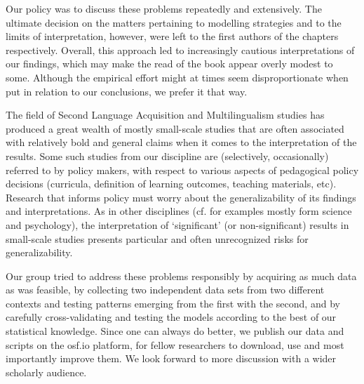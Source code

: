 \documentclass[output=paper]{langsci/langscibook}
\begin{document}
Our policy was to discuss these problems repeatedly and extensively. The ultimate decision on the matters pertaining to modelling strategies and to the limits of interpretation, however, were left to the first authors of the chapters respectively. Overall, this approach led to increasingly cautious interpretations of our findings, which may make the read of the book appear overly modest to some. Although the empirical effort might at times seem disproportionate when put in relation to our conclusions, we prefer it that way.

The field of Second Language Acquisition and Multilingualism studies has produced a great wealth of mostly small-scale studies that are often associated with relatively bold and general claims when it comes to the interpretation of the results. Some such studies from our discipline are (selectively, occasionally) referred to by policy makers, with respect to various aspects of pedagogical policy decisions (curricula, definition of learning outcomes, teaching materials, etc). Research that informs policy must worry about the generalizability of its findings and interpretations. As in other disciplines (cf. \citealt{Ritchie2020} for examples mostly form science and psychology), the interpretation of ‘significant’ (or non-significant) results in small-scale studies presents particular and often unrecognized risks for generalizability.

Our group tried to address these problems responsibly by acquiring as much data as was feasible, by collecting two independent data sets from two different contexts and testing patterns emerging from the first with the second, and by carefully cross-validating and testing the models according to the best of our statistical knowledge. Since one can always do better, we publish our data and scripts on the osf.io platform, for fellow researchers to download, use and most importantly improve them. We look forward to more discussion with a wider scholarly audience.

{\sloppy\printbibliography[heading=subbibliography,notkeyword=this]}
\end{document}
